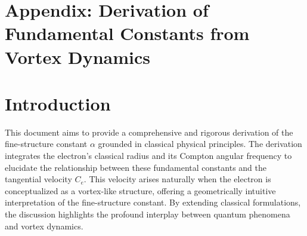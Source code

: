 \documentclass[preprint]{revtex4-2}
\newcommand{\paperdoi}{10.5281/zenodo.15566336}
\begin{document}

%
%
%
%
%
%
%
%
\section{\textbf{Appendix: Derivation of Fundamental Constants from Vortex Dynamics}}
    \label{sec:appendix:1}

    \section*{Introduction}
    This document aims to provide a comprehensive and rigorous derivation of the fine-structure constant $\alpha$ grounded in classical physical principles.
    The derivation integrates the electron's classical radius and its Compton angular frequency to elucidate the relationship between these fundamental constants and the tangential velocity $C_e$.
    This velocity arises naturally when the electron is conceptualized as a vortex-like structure, offering a geometrically intuitive interpretation of the fine-structure constant.
    By extending classical formulations, the discussion highlights the profound interplay between quantum phenomena and vortex dynamics.
\end{document}
